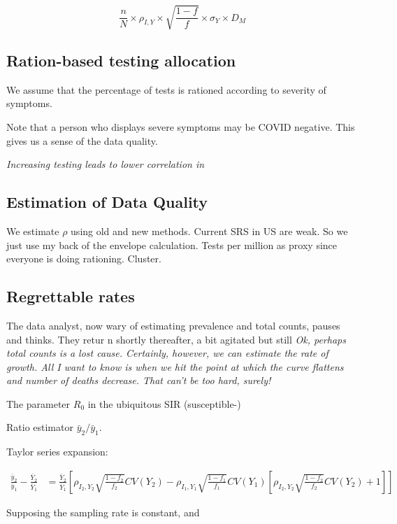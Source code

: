 \documentclass[11pt]{article}
\numberwithin{equation}{section}
\theoremstyle{plain}
\begin{document}
$$
\frac{n}{N} \times \rho_{I,Y} \times \sqrt{\frac{1-f}{f}} \times \sigma_{Y} \times D_M
$$


\subsection{Ration-based testing allocation}

We assume that the percentage of tests is rationed according to severity of symptoms.

Note that a person who displays severe symptoms may be COVID negative.  This gives us a sense of the data quality.

\emph{Increasing testing leads to lower correlation in}

\subsection{Estimation of Data Quality}

We estimate $\rho$ using old and new methods.  Current SRS in US are weak.  So we just use my back of the envelope calculation. Tests per million as proxy since everyone is doing rationing. Cluster.

\subsection{Regrettable rates}

The data analyst, now wary of estimating prevalence and total counts, pauses and thinks.  They retur  n shortly thereafter, a bit agitated but still  \emph{Ok, perhaps total counts is a lost cause. Certainly, however, we can estimate the rate of growth.  All I want to know is when we hit the point at which the curve flattens and number of deaths decrease.  That can't be too hard, surely!}

The parameter $R_0$ in the ubiquitous SIR (susceptible-)

Ratio estimator $\bar y_2/ \bar y_1$.

Taylor series expansion:

$$
\begin{aligned}
\frac{\bar y_2}{\bar y_1} - \frac{\bar Y_2}{\bar Y_1}
&= \frac{\bar Y_2}{\bar Y_1} \left[ \rho_{I_2, Y_2} \sqrt{\frac{1-f_2}{f_2}} CV(Y_2)  - \rho_{I_1,Y_1} \sqrt{\frac{1-f_1}{f_1}} CV (Y_1) \left[ \rho_{I_2, Y_2} \sqrt{\frac{1-f_2}{f_2}} CV(Y_2) + 1 \right] \right]
\end{aligned}
$$

Supposing the sampling rate is constant, and
\end{document}
